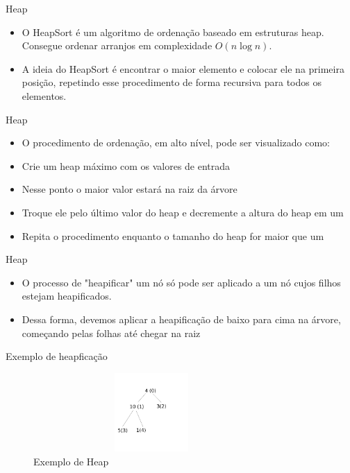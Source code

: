 \begin{frame}
	\begin{block}{Heap}
		\begin{itemize}
			\item O HeapSort é um algoritmo de ordenação baseado em estruturas heap. Consegue ordenar arranjos em complexidade $O(n \log n)$.

			\item A ideia do HeapSort é encontrar o maior elemento e colocar ele na primeira posição, repetindo esse procedimento de forma recursiva para todos os elementos.
		\end{itemize}
	\end{block}
\end{frame}

\begin{frame}
	\begin{block}{Heap}
		\begin{itemize}
			\item O procedimento de ordenação, em alto nível, pode ser visualizado como:
			\item Crie um heap máximo com os valores de entrada
			\item Nesse ponto o maior valor estará na raiz da árvore
			\item Troque ele pelo último valor do heap e decremente a altura do heap em um
			\item Repita o procedimento enquanto o tamanho do heap for maior que um
		\end{itemize}
	\end{block}
\end{frame}


\begin{frame}
	\begin{block}{Heap}
		\begin{itemize}
			\item O processo de "heapificar" um nó só pode ser aplicado a um nó cujos filhos estejam heapificados. 
			\item Dessa forma, devemos aplicar a heapificação de baixo para cima na árvore, começando pelas folhas até chegar na raiz
		\end{itemize}
	\end{block}
\end{frame}

\begin{frame}
	\begin{block}{Exemplo de heapficação}
		\begin{figure}[!htb]
			\centering	  				
			\includegraphics[height=3cm, width = 9cm]{./pic/g127-9.png}
			\caption{Exemplo de Heap \cite{GEEKS_2018}}
		\end{figure}
	\end{block}
\end{frame}

